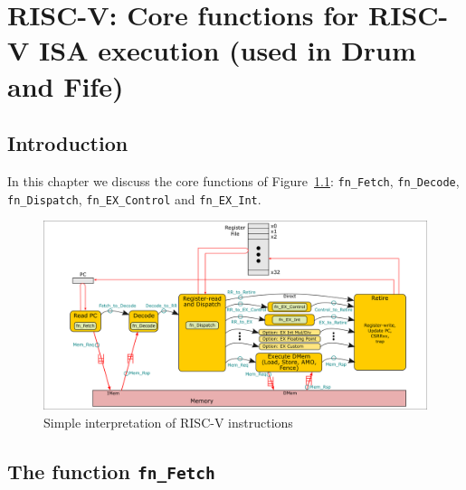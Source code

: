 

\chapter{RISC-V: Core functions for RISC-V ISA execution (used in Drum and Fife)}


\setcounter{page}{1}
\renewcommand{\thepage}{\arabic{chapter}-\arabic{page}}

\label{ch_core_functions}


\section{Introduction}

In this chapter we discuss the core functions of
Figure~\ref{Fig_Core_Simple_Instr_Exec}: \verb|fn_Fetch|,
\verb|fn_Decode|, \verb|fn_Dispatch|, \verb|fn_EX_Control| and
\verb|fn_EX_Int|.
\begin{figure}[htbp]
  \centerline{\includegraphics[width=6in,angle=0]{Figures/Fig_Instr_Exec_w_structs}}
  \caption{\label{Fig_Core_Simple_Instr_Exec}
           Simple interpretation of RISC-V instructions}
\end{figure}


\section{The function {\tt fn\_Fetch}}

